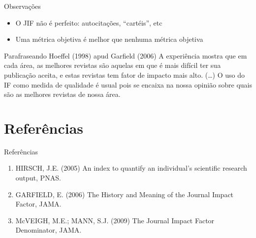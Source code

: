 \documentclass{beamer}
\begin{document}
\begin{frame}{Observações}
  \begin{itemize}
    \footnotesize
  \item O JIF não é perfeito: autocitações, ``cartéis'', etc
    \bigskip
  \item Uma métrica objetiva é melhor que nenhuma métrica objetiva
  \end{itemize}
  \bigskip
  \bigskip
  \begin{block}{Parafraseando Hoeffel (1998) apud Garfield (2006)}
    \scriptsize
A experiência mostra que em cada área, as melhores revistas são aquelas em que é mais difícil ter sua publicação aceita, e estas revistas tem fator de impacto mais alto. (\ldots) O uso do IF como medida de qualidade é usual pois se encaixa na nossa opinião sobre quais são as melhores revistas de nossa área.
  \end{block}
\end{frame}

\section{Referências}

\begin{frame}{Referências}
  \begin{enumerate}
    \tiny
  \item<1-> HIRSCH, J.E. (2005) An index to quantify an individual's scientific research output, PNAS.
  \bigskip
  \item<1-> GARFIELD, E. (2006) The History and Meaning of the Journal Impact Factor, JAMA.
  \bigskip
  \item<1-> McVEIGH, M.E.; MANN, S.J. (2009) The Journal Impact Factor Denominator, JAMA.
  \end{enumerate}
\end{frame}
\end{document}
